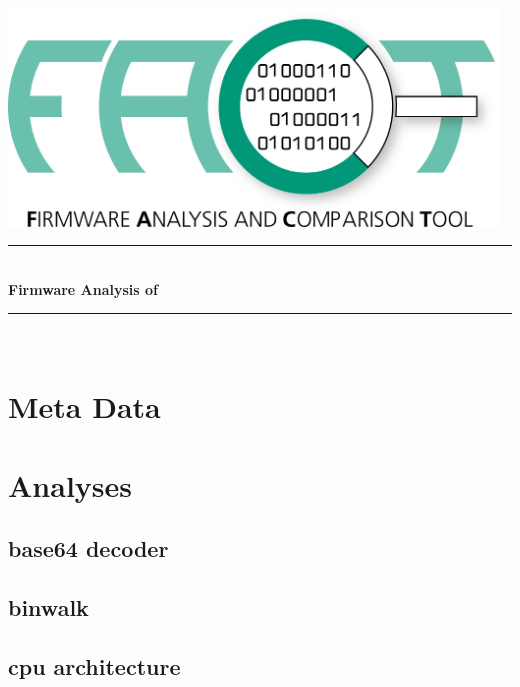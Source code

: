 \documentclass{article}
\begin{document}
\begin{titlepage}

\newcommand{\HRule}{\rule{\linewidth}{0.5mm}}

\center

\includegraphics[width = 13cm]{fact_logo.png}\\[3cm]

\HRule \\[0.4cm]
{\selectfont
{\Large \bfseries Firmware Analysis of }\\[0.4cm]
}
\HRule \\[1.5cm]

\vfill
\end{titlepage}

\section*{Meta Data}
{\selectfont

}

\section*{Analyses}

    \subsection*{base64 decoder}
    {\selectfont
    
    }

    \subsection*{binwalk}
    {\selectfont
    
    }

    \subsection*{cpu architecture}
    {\selectfont
    
    }
\end{document}
